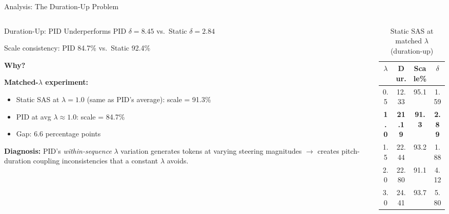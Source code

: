 \documentclass[aspectratio=169, 11pt]{beamer}
\begin{document}
\begin{frame}{Analysis: The Duration-Up Problem}

\begin{columns}[T]
\begin{column}{0.48\textwidth}
\begin{alertblock}{Duration-Up: PID Underperforms}
\small
PID $\delta{=}8.45$ vs.\ Static $\delta{=}2.84$

\vspace{0.2em}
Scale consistency: PID 84.7\% vs.\ Static 92.4\%

\vspace{0.2em}
\textbf{Why?}
\end{alertblock}

\vspace{0.3em}
\textbf{Matched-$\lambda$ experiment:}
\begin{itemize}
  \item Static SAS at $\lambda{=}1.0$ (same as PID's average): scale = 91.3\%
  \item PID at avg $\lambda{\approx}1.0$: scale = 84.7\%
  \item Gap: $6.6$ percentage points
\end{itemize}

\vspace{0.3em}
\textbf{Diagnosis:} PID's \emph{within-sequence} $\lambda$ variation generates tokens at varying steering magnitudes $\to$ creates pitch-duration coupling inconsistencies that a constant $\lambda$ avoids.
\end{column}

\begin{column}{0.48\textwidth}
\begin{table}
\centering\small
\caption*{Static SAS at matched $\lambda$ (duration-up)}
\begin{tabular}{cccc}
  \toprule
  $\lambda$ & Dur. & Scale\% & $\delta$ \\
  \midrule
  0.5 & 12.33 & 95.1 & 1.59 \\
  \textbf{1.0} & \textbf{21.19} & \textbf{91.3} & \textbf{2.89} \\
  1.5 & 22.44 & 93.2 & 1.88 \\
  2.0 & 22.80 & 91.1 & 4.12 \\
  3.0 & 24.41 & 93.7 & 5.80 \\
  \bottomrule
\end{tabular}
\end{table}


\end{column}
\end{columns}
\end{frame}
\end{document}
